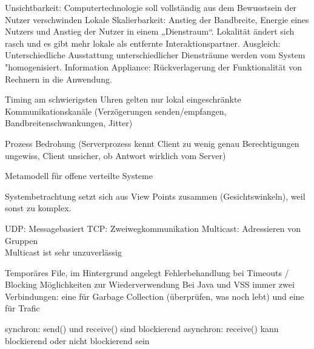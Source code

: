 \documentclass[ngerman,a4paper,12pt]{scrreprt}
\begin{document}
\ul
	\li  Unsichtbarkeit:
	\ra Computertechnologie soll vollständig aus dem Bewusstsein der Nutzer
	verschwinden
	\li Lokale Skalierbarkeit:
	\ra Anstieg der Bandbreite, Energie eines Nutzers und Anstieg der Nutzer
	in einem „Dienstraum“. Lokalität ändert sich rasch und es gibt mehr
	lokale als entfernte Interaktionspartner.
	\li Ausgleich:
	\ra Unterschiedliche Ausstattung unterschiedlicher Diensträume werden
	vom System "homogenisiert.
	\li Information Appliance:
	\ra Rückverlagerung der Funktionalität von Rechnern in die Anwendung.
\ulE


\ul
	\li Timing am schwierigsten
	\li Uhren gelten nur lokal
	\li eingeschränkte Kommunikationskanäle (Verzögerungen senden/empfangen, Bandbreitenschwankungen, Jitter)
\ulE


\ul
	\li Prozess Bedrohung (Serverprozess kennt Client zu wenig genau \ra Berechtigungen ungewiss, Client unsicher, ob Antwort wirklich vom Server)
\ulE

Metamodell für offene verteilte Systeme

Systembetrachtung setzt sich aus View Points zusammen (Gesichtswinkeln), weil  sonst zu komplex.






\ul
	\li UDP: Messagebasiert
	\li TCP: Zweiwegkommunikation
	\li Multicast: Adressieren von Gruppen \\
		Multicast ist sehr unzuverlässig
\ulE

\ul
	\li Temporäres File, im Hintergrund angelegt
	\li Fehlerbehandlung bei Timeouts / Blocking
	\li Möglichkeiten zur Wiederverwendung
	\li Bei Java und VSS immer zwei Verbindungen: eine für Garbage Collection (überprüfen, was noch lebt) und eine für Trafic
\ulE

\ul
	\li synchron: send() und receive() sind blockierend
	\li asynchron: receive() kann blockierend oder nicht blockierend sein
\ulE
\end{document}
